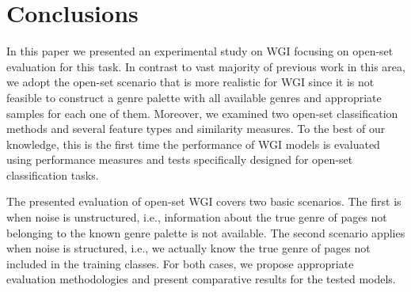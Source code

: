\documentclass[runningheads]{llncs}
\begin{document}

%
\section{Conclusions}\label{sec:conclusions}

In this paper we presented an experimental study on WGI focusing on open-set evaluation for this task. In contrast to vast majority of previous work in this area, we adopt the open-set scenario that is more realistic for WGI since it is not feasible to construct a genre palette with all available genres and appropriate samples for each one of them. Moreover, we examined two open-set classification methods and several feature types and similarity measures. To the best of our knowledge, this is the first time the performance of WGI models is evaluated using performance measures and tests specifically designed for open-set classification tasks.

The presented evaluation of open-set WGI covers two basic scenarios. The first is when noise is unstructured, i.e., information about the true genre of pages not belonging to the known genre palette is not available. The second scenario applies when noise is structured, i.e., we actually know the true genre of pages not included in the training classes. For both cases, we propose appropriate evaluation methodologies and present comparative results for the tested models.
\end{document}
